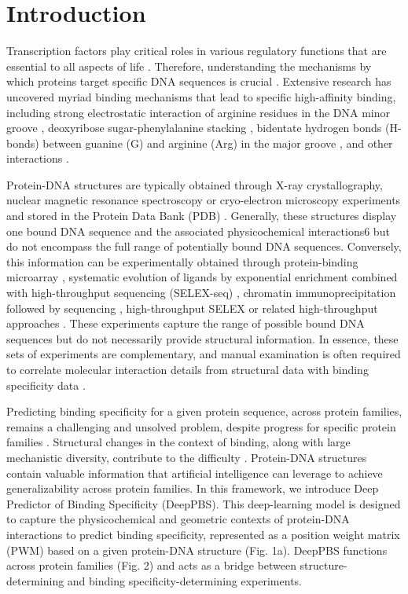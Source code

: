 \section{Introduction} 

Transcription factors play critical roles in various regulatory functions that are essential to all aspects of life \citep{Spitz2012}. Therefore, understanding the mechanisms by which proteins target specific DNA sequences is crucial \citep{Zhao2009}. Extensive research has uncovered myriad binding mechanisms that lead to specific high-affinity binding, including strong electrostatic interaction of arginine residues in the DNA minor groove \citep{rohs2009role}, deoxyribose sugar-phenylalanine stacking \citep{stirnimann2010structural}, bidentate hydrogen bonds (H-bonds) between guanine (G) and arginine (Arg) in the major groove \citep{Helene1977}, and other interactions \citep{Rohs2010,Schildbach1999,Seeman1976}.
\par
Protein-DNA structures are typically \citep{Garvie2001} obtained through X-ray crystallography, nuclear magnetic resonance spectroscopy or cryo-electron microscopy experiments and stored in the Protein Data Bank (PDB) \citep{berman2000protein}. Generally, these structures display one bound DNA sequence and the associated physicochemical interactions6 but do not encompass the full range of potentially bound DNA sequences. Conversely, this information can be experimentally obtained through protein-binding microarray \citep{Berger2009}, systematic evolution of ligands by exponential enrichment combined with high-throughput sequencing (SELEX-seq) \citep{Slattery2011}, chromatin immunoprecipitation followed by sequencing \citep{Park2009}, high-throughput SELEX \citep{Jolma2013} or related high-throughput approaches \citep{Slattery2014}. These experiments capture the range of possible bound DNA sequences but do not necessarily provide structural information. In essence, these sets of experiments are complementary, and manual examination is often required to correlate molecular interaction details from structural data with binding specificity data \citep{rohs2009role}.
\par
Predicting binding specificity for a given protein sequence, across protein families, remains a challenging and unsolved problem, despite progress for specific protein families \citep{persikov2014novo, Wetzel2022, persikov2009predicting, Gazit2022, Meseguer2020, molparia2010zif, christensen2012recognition, Yanover2011}. Structural changes in the context of binding, along with large mechanistic diversity, contribute to the difficulty \citep{Slattery2014, Chiu2023}. Protein-DNA structures contain valuable information that artificial intelligence can leverage to achieve generalizability across protein families. In this framework, we introduce Deep Predictor of Binding Specificity (DeepPBS). This deep-learning model is designed to capture the physicochemical and geometric contexts of protein-DNA interactions to predict binding specificity, represented as a position weight matrix (PWM) \citep{Stormo2013} based on a given protein-DNA structure (Fig. 1a). DeepPBS functions across protein families (Fig. 2) and acts as a bridge between structure-determining and binding specificity-determining experiments.
